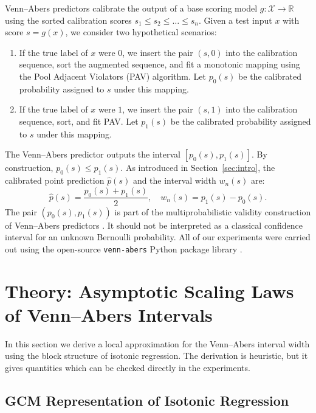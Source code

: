 \documentclass[11pt]{article}
\begin{document}
	Venn--Abers predictors calibrate the output of a base scoring model $g: \mathcal{X} \to \mathbb{R}$ using the sorted calibration scores $s_1 \le s_2 \le \dots \le s_n$. Given a test input $x$ with score $s = g(x)$, we consider two hypothetical scenarios:
	\begin{enumerate}
		\item If the true label of $x$ were $0$, we insert the pair $(s, 0)$ into the calibration sequence, sort the augmented sequence, and fit a monotonic mapping using the Pool Adjacent Violators (PAV) algorithm. Let $p_0(s)$ be the calibrated probability assigned to $s$ under this mapping.
		\item If the true label of $x$ were $1$, we insert the pair $(s, 1)$ into the calibration sequence, sort, and fit PAV. Let $p_1(s)$ be the calibrated probability assigned to $s$ under this mapping.
	\end{enumerate}
	
	The Venn--Abers predictor outputs the interval $[p_0(s), p_1(s)]$. By construction, $p_0(s) \le p_1(s)$. As introduced in Section~\ref{sec:intro}, the calibrated point prediction $\hat{p}(s)$ and the interval width $w_n(s)$ are:
	\begin{equation}
		\hat{p}(s) = \frac{p_0(s) + p_1(s)}{2}, \quad w_n(s) = p_1(s) - p_0(s).
	\end{equation}
	The pair $(p_0(s), p_1(s))$ is part of the multiprobabilistic validity construction of Venn--Abers predictors \cite{vovk2015}. It should not be interpreted as a classical confidence interval for an unknown Bernoulli probability. All of our experiments were carried out using the open-source \texttt{venn-abers} Python package library \cite{vennaberspkg}.
	
	\section{Theory: Asymptotic Scaling Laws of Venn--Abers Intervals}
	\label{sec:theory}
	
	In this section we derive a local approximation for the Venn--Abers interval width using the block structure of isotonic regression. The derivation is heuristic, but it gives quantities which can be checked directly in the experiments.
	
	\subsection{GCM Representation of Isotonic Regression}
	
\end{document}
